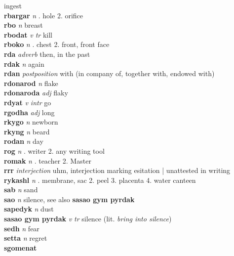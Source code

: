ingest\\\textbf{rbargar}   \emph{n} . hole 2. orifice \\\textbf{rbo}   \emph{n} \textperiodcentered breast\\\textbf{rbodat}   \emph{v tr} \textperiodcentered kill\\\textbf{rboko}   \emph{n} . chest 2. front, front face \\\textbf{rda}   \emph{adverb} \textperiodcentered then, in the past\\\textbf{rdak}   \emph{n} \textperiodcentered again\\\textbf{rdan}   \emph{postposition} \textperiodcentered with (in company of, together with, endowed with)\\\textbf{rdonarod}   \emph{n} \textperiodcentered flake\\\textbf{rdonaroda}   \emph{adj} \textperiodcentered flaky\\\textbf{rdyat}   \emph{v intr} \textperiodcentered go\\\textbf{rgodha}   \emph{adj} \textperiodcentered long\\\textbf{rkygo}   \emph{n} \textperiodcentered newborn\\\textbf{rkyng}   \emph{n} \textperiodcentered beard\\\textbf{rodan}   \emph{n} \textperiodcentered day\\\textbf{rog}   \emph{n} . writer 2. any writing tool \\\textbf{romak}   \emph{n} . teacher 2. Master \\\textbf{rrr}   \emph{interjection} \textperiodcentered uhm, interjection marking esitation | unattested in writing\\\textbf{rykashl}   \emph{n} . membrane, sac 2. peel 3. placenta 4. water canteen \\\textbf{sab}   \emph{n} \textperiodcentered sand\\\textbf{sao}   \emph{n} \textperiodcentered silence, see also \textbf{sasao gym pyrdak}\\\textbf{sapedyk}   \emph{n} \textperiodcentered dust\\\textbf{sasao gym pyrdak}   \emph{v tr} \textperiodcentered silence (lit. \emph{bring into silence})\\\textbf{sedh}   \emph{n} \textperiodcentered fear\\\textbf{setta}   \emph{n} \textperiodcentered regret\\\textbf{sgomenat} 